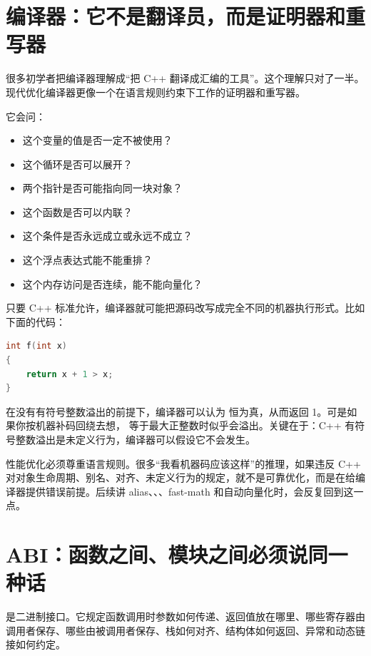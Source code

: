 \section{编译器：它不是翻译员，而是证明器和重写器}

很多初学者把编译器理解成“把 C++ 翻译成汇编的工具”。这个理解只对了一半。现代优化编译器更像一个在语言规则约束下工作的证明器和重写器。

它会问：

\begin{itemize}
  \item 这个变量的值是否一定不被使用？
  \item 这个循环是否可以展开？
  \item 两个指针是否可能指向同一块对象？
  \item 这个函数是否可以内联？
  \item 这个条件是否永远成立或永远不成立？
  \item 这个浮点表达式能不能重排？
  \item 这个内存访问是否连续，能不能向量化？
\end{itemize}

只要 C++ 标准允许，编译器就可能把源码改写成完全不同的机器执行形式。比如下面的代码：

\begin{lstlisting}[language=C++]
int f(int x)
{
    return x + 1 > x;
}
\end{lstlisting}

在没有有符号整数溢出的前提下，编译器可以认为  恒为真，从而返回 1。可是如果你按机器补码回绕去想， 等于最大正整数时似乎会溢出。关键在于：C++ 有符号整数溢出是未定义行为，编译器可以假设它不会发生。

\begin{deepdive}
性能优化必须尊重语言规则。很多“我看机器码应该这样”的推理，如果违反 C++ 对对象生命周期、别名、对齐、未定义行为的规定，就不是可靠优化，而是在给编译器提供错误前提。后续讲 alias、、、fast-math 和自动向量化时，会反复回到这一点。
\end{deepdive}

\section{ABI：函数之间、模块之间必须说同一种话}

 是二进制接口。它规定函数调用时参数如何传递、返回值放在哪里、哪些寄存器由调用者保存、哪些由被调用者保存、栈如何对齐、结构体如何返回、异常和动态链接如何约定。


